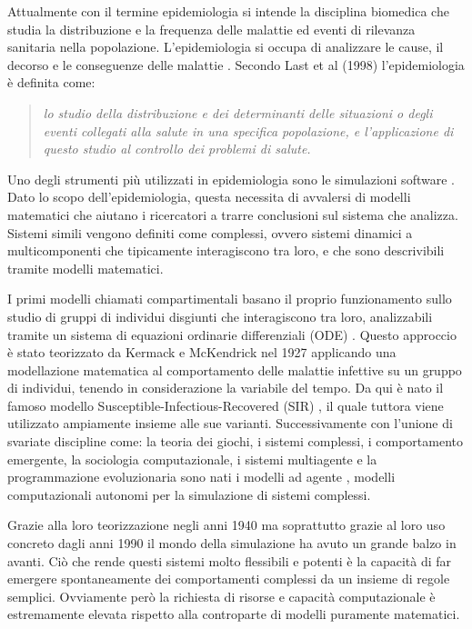 Attualmente con il termine epidemiologia si intende la 
disciplina biomedica che studia la distribuzione e la 
frequenza delle malattie ed eventi di rilevanza sanitaria 
nella popolazione. L’epidemiologia si occupa di analizzare 
le cause, il decorso e le conseguenze delle malattie \cite{wiki:Epidemiologia}. 
Secondo Last et al (1998) l’epidemiologia è definita come: 

\begin{quotation}
    \emph{lo studio della distribuzione e dei determinanti 
    delle situazioni o degli eventi collegati alla salute 
    in una specifica popolazione, e l'applicazione di 
    questo studio al controllo dei problemi di salute.}
\end{quotation}

Uno degli strumenti più utilizzati in epidemiologia sono le 
simulazioni software \cite{wiki:Simulation_software}. 
Dato lo scopo dell’epidemiologia, questa necessita di 
avvalersi di modelli matematici \cite{doi:10.4161/viru.24041} 
che aiutano i ricercatori a trarre conclusioni sul sistema 
che analizza. Sistemi simili vengono definiti come complessi,
\cite{Galea2009-lj} \cite{Ladyman2013} ovvero sistemi 
dinamici a multicomponenti che tipicamente interagiscono 
tra loro, e che sono descrivibili tramite modelli matematici. 

I primi modelli chiamati compartimentali \cite{Bjornstad2020} 
basano il proprio funzionamento sullo studio di gruppi di 
individui disgiunti che interagiscono tra loro, 
analizzabili tramite un sistema di equazioni ordinarie 
differenziali (ODE) \cite{Brauer2008}. 
Questo approccio è stato teorizzato da Kermack e McKendrick 
nel 1927 applicando una modellazione matematica al comportamento 
delle malattie infettive su un gruppo di individui, tenendo in 
considerazione la variabile del tempo. Da qui è nato il famoso modello 
Susceptible-Infectious-Recovered (SIR) \cite{wiki:Compartmental_models_in_epidemiology}, 
il quale tuttora viene utilizzato ampiamente insieme alle sue varianti. 
Successivamente con l’unione di svariate discipline come: 
la teoria dei giochi, i sistemi complessi, i comportamento emergente, 
la sociologia computazionale, i sistemi multiagente e 
la programmazione evoluzionaria sono nati i modelli ad agente 
\cite{7822080} \cite{Bissett2021}, modelli computazionali 
autonomi per la simulazione di sistemi complessi. 

Grazie alla loro teorizzazione negli anni 1940 ma soprattutto 
grazie al loro uso concreto dagli anni 1990 il mondo della 
simulazione ha avuto un grande balzo in avanti. 
Ciò che rende questi sistemi molto flessibili e potenti è la 
capacità di far emergere spontaneamente dei comportamenti 
complessi da un insieme di regole semplici. 
Ovviamente però la richiesta di risorse e capacità 
computazionale è estremamente elevata rispetto alla 
controparte di modelli puramente matematici. 

